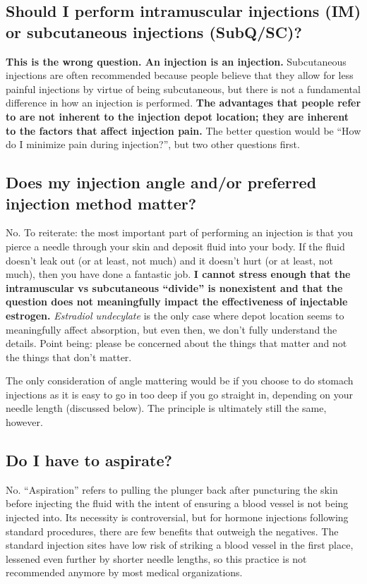 \documentclass{article}
\begin{document}
\subsection{Should I perform intramuscular injections (IM) or subcutaneous injections (SubQ/SC)?}

\textbf{This is the wrong question. An injection is an injection.} Subcutaneous injections are often recommended because people believe that they allow for less painful injections by virtue of being subcutaneous, but there is not a fundamental difference in how an injection is performed. \textbf{The advantages that people refer to are not inherent to the injection depot location; they are inherent to the factors that affect injection pain.} The better question would be “How do I minimize pain during injection?”, but two other questions first.

\subsection{Does my injection angle and/or preferred injection method matter?}\label{5-9}

No. To reiterate: the most important part of performing an injection is that you pierce a needle through your skin and deposit fluid into your body. If the fluid doesn’t leak out (or at least, not much) and it doesn’t hurt (or at least, not much), then you have done a fantastic job. \textbf{I cannot stress enough that the intramuscular vs subcutaneous “divide” is nonexistent and that the question does not meaningfully impact the effectiveness of injectable estrogen.} \textit{Estradiol undecylate} is the only case where depot location seems to meaningfully affect absorption, but even then, we don’t fully understand the details. Point being: please be concerned about the things that matter and not the things that don’t matter.

The only consideration of angle mattering would be if you choose to do stomach injections as it is easy to go in too deep if you go straight in, depending on your needle length (discussed below). The principle is ultimately still the same, however.

\subsection{Do I have to aspirate?}

No. “Aspiration” refers to pulling the plunger back after puncturing the skin before injecting the fluid with the intent of ensuring a blood vessel is not being injected into. Its necessity is controversial, but for hormone injections following standard procedures, there are few benefits that outweigh the negatives. The standard injection sites have low risk of striking a blood vessel in the first place, lessened even further by shorter needle lengths, so this practice is not recommended anymore by most medical organizations.
\end{document}
